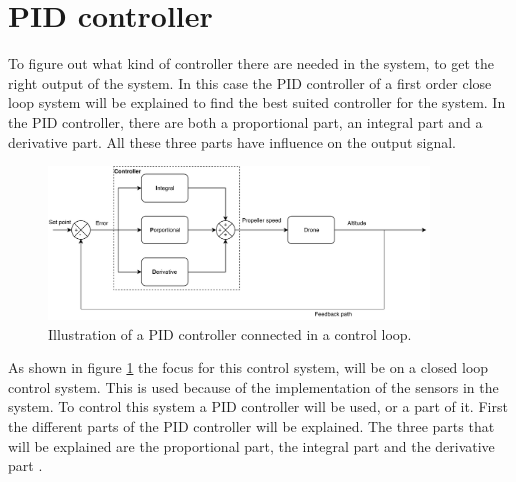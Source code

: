 \section{PID controller}
To figure out what kind of controller there are needed in the system, to get the right output of the system. In this case the PID controller of a first order close loop system will be explained to find the best suited controller for the system. In the PID controller, there are both a proportional part, an integral part and a derivative part. All these three parts have influence on the output signal. 

\begin{figure}[H]
    \centering
    \includegraphics[width=0.9\textwidth]{figures/ch_design/PIDController/PIDControl.pdf}
    \caption{Illustration of a PID controller connected in a control loop.}
    \label{fig:PID_Controller}
\end{figure}
As shown in figure \ref{fig:PID_Controller} the focus for this control system, will be on a closed loop control system. This is used because of the implementation of the sensors in the system. To control this system a PID controller will be used, or a part of it. First the different parts of the PID controller will be explained. The three parts that will be explained are the proportional part, the integral part and the derivative part \cite{digital_control}.

